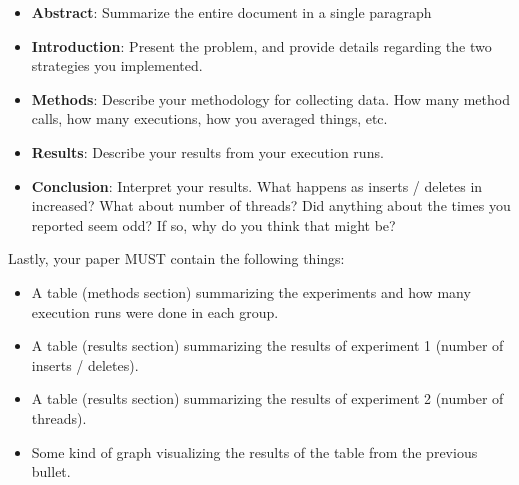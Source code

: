 \documentclass[paper=a4, fontsize=11pt, parskip=full]{scrartcl} %
\numberwithin{equation}{section} %
\numberwithin{figure}{section} %
\numberwithin{table}{section} %
\begin{document}
\begin{itemize}
	\item \textbf{Abstract}: Summarize the entire document in a single paragraph
	\item \textbf{Introduction}: Present the problem, and provide details regarding the two strategies you implemented.
	\item \textbf{Methods}: Describe your methodology for collecting data. How many method calls, how many executions, how you averaged things, etc.
	\item \textbf{Results}: Describe your results from your execution runs.
	\item \textbf{Conclusion}: Interpret your results. What happens as inserts / deletes in increased? What about number of threads? Did anything about the times you reported seem odd? If so, why do you think that might be?
\end{itemize}

Lastly, your paper MUST contain the following things:

\begin{itemize}
	\item A table (methods section) summarizing the experiments and how many execution runs were done in each group.
	\item A table (results section) summarizing the results of experiment 1 (number of inserts / deletes).
	\item A table (results section) summarizing the results of experiment 2 (number of threads).
	\item Some kind of graph visualizing the results of the table from the previous bullet.
\end{itemize}


\end{document}
